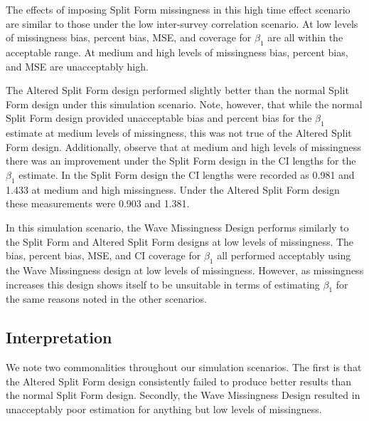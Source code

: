 \documentclass{svjour3}\usepackage[]{graphicx}\usepackage[]{color}
\begin{document}
The effects of imposing Split Form missingness in this high time effect scenario are similar to those under the low inter-survey correlation scenario. At low levels of missingness bias, percent bias, MSE, and coverage for $\beta_1$ are all within the acceptable range. At medium and high levels of missingness bias, percent bias, and MSE are unacceptably high. \par 

The Altered Split Form design performed slightly better than the normal Split Form design under this simulation scenario. Note, however, that while the normal Split Form design provided unacceptable bias and percent bias for the $\beta_1$ estimate at medium levels of missingness, this was not true of the Altered Split Form design. Additionally, observe that at medium and high levels of missingness there was an improvement under the Split Form design in the CI lengths for the $\beta_1$ estimate. In the Split Form design the CI lengths were recorded as 0.981 and 1.433 at medium and high missingness. Under the Altered Split Form design these measurements were 0.903 and 1.381. \par

In this simulation scenario, the Wave Missingness Design performs similarly to the Split Form and Altered Split Form designs at low levels of missingness. The bias, percent bias, MSE, and CI coverage for $\beta_1$ all performed acceptably using the Wave Missingness design at low levels of missingness. However, as missingness increases this design shows itself to be unsuitable in terms of estimating $\beta_1$ for the same reasons noted in the other scenarios. \par

\subsection{Interpretation}
\label{sec:3.5}
We note two commonalities throughout our simulation scenarios. The first is that the Altered Split Form design consistently failed to produce better results than the normal Split Form design. Secondly, the Wave Missingness Design resulted in unacceptably poor estimation for anything but low levels of missingness. \par
\end{document}
